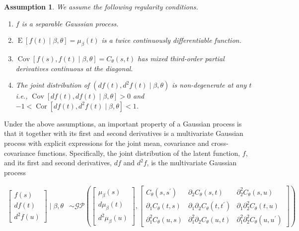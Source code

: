 \documentclass[11pt,]{article}
\DeclareMathOperator*{\E}{E}
\DeclareMathOperator*{\Cov}{Cov}
\DeclareMathOperator*{\Cor}{Cor}
\newtheorem{assumption}{Assumption}
\theoremstyle{nonumberplain}
\begin{document}
\vspace{0.2cm}

\begin{assumption}
We assume the following regularity conditions.
\begin{enumerate}
  \item[A1:]{$f$ is a separable Gaussian process.}
  \item[A2:]{$\E[f(t) \mid \beta, \theta] = \mu_{\beta}(t)$ is a twice continuously differentiable function.}
  \item[A3:]{$\Cov[f(s), f(t) \mid \beta, \theta] = C_\theta(s,t)$ has mixed third-order partial derivatives continuous at the diagonal.}
  \item[A4:]{The joint distribution of $(df(t), d^2\!f(t) \mid \beta, \theta)$ is non-degenerate at any $t$ i.e., $\Cov[df(t), df(t) \mid \beta, \theta] > 0$ and $-1 < \Cor[df(t), d^2\!f(t) \mid \beta, \theta] < 1$.}
\end{enumerate}
\label{assumptions}
\end{assumption}

Under the above assumptions, an important property of a Gaussian process
is that it together with its first and second derivatives is a
multivariate Gaussian process with explicit expressions for the joint
mean, covariance and cross-covariance functions. Specifically, the joint
distribution of the latent function, \(f\), and its first and second
derivatives, \(df\) and \(d^2\!f\), is the multivariate Gaussian process

\begin{align}
  \begin{bmatrix}f(s)\\ df(t)\\ d^2\!f(u)\end{bmatrix} \mid \beta, \theta &\sim \mathcal{GP}\left(\begin{bmatrix}\mu_\beta(s)\\ d\mu_\beta(t)\\ d^2\!\mu_\beta(u)\end{bmatrix}, \begin{bmatrix}C_\theta(s, s^\prime) & \partial_2 C_\theta(s, t) & \partial_2^2 C_\theta(s, u)\\ \partial_1 C_\theta(t, s) & \partial_1 \partial_2 C_\theta(t, t^\prime) & \partial_1 \partial_2^2 C_\theta(t, u)\\ \partial_1^2 C_\theta(u, s) & \partial_1^2\partial_2 C_\theta(u, t) & \partial_1^2 \partial_2^2 C_\theta(u, u^\prime)\end{bmatrix}\right)\label{eq:latentJoint}
\end{align}
\end{document}

